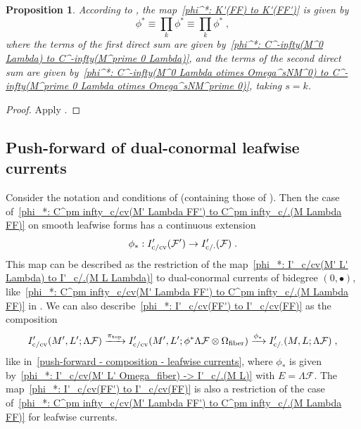 \documentclass{memo-l}
\theoremstyle{plain}
\newtheorem{prop}[thm]{Proposition}
\theoremstyle{definition}
\theoremstyle{remark}
\newcommand{\FF}{\mathcal{F}}
\newcommand{\fiber}{{\text{\rm fiber}}}
\newcommand{\topd}{{\text{\rm top}}}
\newcommand{\co}{{\text{\rm c}}}
\newcommand{\cv}{{\text{\rm cv}}}
\numberwithin{section}{chapter}
\numberwithin{equation}{section}%
\begin{document}
\begin{prop}\label{p: phi^* equiv prod_k phi^*}
According to , the map~\eqref{phi^*: K'(FF) to K'(FF')} is given by
\[
\phi^*\equiv\prod_k\phi^*\equiv\prod_k\phi^*\;,
\]
where the terms of the first direct sum are given by~\eqref{phi^*: C^-infty(M^0 Lambda) to C^-infty(M^prime 0 Lambda)}, and the terms of the second direct sum are given by~\eqref{phi^*: C^-infty(M^0 Lambda otimes Omega^sNM^0) to C^-infty(M^prime 0 Lambda otimes Omega^sNM^prime 0)}, taking $s=k$.
\end{prop}

\begin{proof}
Apply .  
\end{proof}



\subsection{Push-forward of dual-conormal leafwise currents}\label{ss: push-forward of dual-conormal leafwise currents}

Consider the notation and conditions of  (containing those of ). Then the case of~\eqref{phi_*: C^pm infty_c/cv(M' Lambda FF') to C^pm infty_c/.(M Lambda FF)} on smooth leafwise forms has a continuous extension
\begin{equation}\label{phi_*: I'_c/cv(FF') to I'_c/cv(FF)}
\phi_*:I'_{\co/\cv}(\FF')\to I'_{\co/{\cdot}}(\FF)\;.
\end{equation}
This map can be described as the restriction of the map~\eqref{phi_*: I'_c/cv(M' L' Lambda) to I'_c/.(M L Lambda)} to dual-conormal currents of bidegree $(0,\bullet)$, like~\eqref{phi_*: C^pm infty_c/cv(M' Lambda FF') to C^pm infty_c/.(M Lambda FF)} in . We can also describe~\eqref{phi_*: I'_c/cv(FF') to I'_c/cv(FF)} as the composition
\[
I'_{\co/\cv}(M',L';\Lambda\FF)\xrightarrow{\pi_\topd}I'_{\co/\cv}(M',L';\phi^*\Lambda\FF\otimes\Omega_\fiber)
\xrightarrow{\phi_*}I'_{\co/{\cdot}}(M,L;\Lambda\FF)\;,
\]
like in~\eqref{push-forward - composition - leafwise currents}, where $\phi_*$ is given by~\eqref{phi_*: I'_c/cv(M' L' Omega_fiber) -> I'_c/.(M L)} with $E=\Lambda\FF$. The map~\eqref{phi_*: I'_c/cv(FF') to I'_c/cv(FF)} is also a restriction of the case of~\eqref{phi_*: C^pm infty_c/cv(M' Lambda FF') to C^pm infty_c/.(M Lambda FF)} for leafwise currents.
\end{document}

